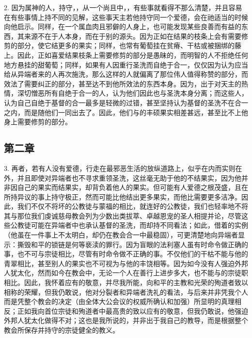 2. 因为属神的人，持守，，从一个尚且中，，有些事就看得不那么清楚，并且容易在有些事情上持不同的见解，这些事天主若他持守同一个爱德，会在祂适当的时候向他启示。同样，在一个属血肉且邪僻的人身上，也可能发现某些良善而有益的东西，其来源不在于人本身，而在于别的源头。因为正如在结果的枝条上会有需要修剪的部分，使它结更多的果实；同样，也常有葡萄挂在贫瘠、干枯或被捆绑的藤上。因此，正如喜爱结果枝条上需要修剪的部分是愚昧的，而明智的人不拒绝任何地方悬挂的甜葡萄；同样，如果有人因重行圣洗而自绝于合一，仅仅因为认为应当给从异端者来的人再次施洗，那么这样的人就偏离了那位伟人值得称赞的部分，而效法了需要纠正的部分，甚至达不到他所效法的东西本身。因为，出于对天主的热情，深切憎恶所有自绝于合一的人，认为他们因此也与圣洗本身分离；而这些人，认为自己自绝于基督的合一最多是轻微的过错，甚至坚持认为基督的圣洗不在合一之内，而是随他们一同出去了。因此，他们与的丰硕果实相差甚远，甚至比不上他身上需要修剪的部分。\par


\subsection{第二章}

3. 再者，若有人没有爱德，行走在最邪恶生活的放纵道路上，似乎在内而实则在外，并且即使对异端者也不寻求重领圣洗，这丝毫无助于他的不结果实，因为他并非因自己的果实而结果实，却背负着他人的果实。但可能有人爱德之根茂盛，且在所持异议的事上持守极正，然而可能比他结出更多果实，而他比需要更多洁净。因此，我们不仅不将坏的公教徒与蒙福的相比，就连好的公教徒，我们也轻率地不将其与那位我们虔诚慈母教会列为少数出类拔萃、卓越恩宠的圣人相提并论，尽管这些公教徒可能在异端者中也承认基督的圣洗，而却持不同看法；如此，借着的实例（他虽在一件事上不太明白，却仍在教会合一中最稳固），可更清楚地向异端者显示：撕毁和平的锁链是何等亵渎的罪行。因为盲眼的法利塞人虽有时命令做正确的事，也不可与宗徒相比，尽管有时命令做不正确的事。不仅他们的干枯不能与他的青翠相比，甚至别人的果实也不可视为与他的丰饶相等。因为如今没有人强迫外邦人犹太化，然而如今在教会中，无论一个人在善行上进步多大，也不能与的宗徒职相比。因此，我怀着应有的敬意，并尽我所能，向和平的主教和光荣的殉道者致以相称的荣耀，但我仍敢说，他对分裂者和异端者洗礼的看法，与后来并非凭我个人而是凭整个教会的决定（由全体大公会议的权威所确认和加强）所显明的真理相反；正如我向首位宗徒和殉道者中最高贵的致以应有的敬意，但我仍敢说，他强迫外邦人犹太化做得不对；这也是我所说的，并非出于我自己的教导，而是根据整个教会所保存并持守的宗徒健全的教义。\par

